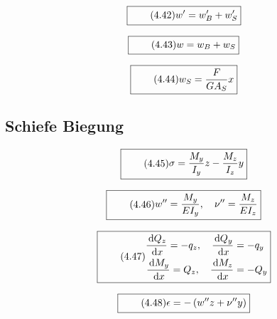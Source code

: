 \documentclass[11pt]{article}
\newcommand{\1}{ {\mathds{1}} }
\newcommand{\td}{\,\text{d}}
\begin{document}
\begin{multicols}{2}
		\begin{equation}
			\boxed{
				\tag{4.42}
				\begin{split}
					w' = w_B' + w_S'
				\end{split}
			}
		\end{equation}

		\begin{equation}
			\boxed{
				\tag{4.43}
				\begin{split}
					w = w_B + w_S
				\end{split}
			}
		\end{equation}
		
		\begin{equation}
			\boxed{
				\tag{4.44}
				\begin{split}
					w_S= \frac{F}{GA_S}x
				\end{split}
			}
		\end{equation}

		\subsection{Schiefe Biegung}

		\begin{equation}
			\boxed{
				\tag{4.45}
				\begin{split}
					\sigma = \frac{M_y}{I_y}z - \frac{M_z}{I_z}y
				\end{split}
			}
		\end{equation}
		
		\begin{equation}
			\boxed{
				\tag{4.46}
				\begin{split}
					w'' = \frac{M_y}{EI_y} , \quad \nu '' = \frac{M_z}{EI_z}
				\end{split}
			}
		\end{equation}

		\begin{equation}
			\boxed{
				\tag{4.47}
				\begin{split}
					\frac{\td Q_z}{\td x} = -q_z, \quad \frac{\td Q_y}{\td x} &= -q_y\\
					\frac{\td M_y}{\td x} = Q_z, \quad \frac{\td M_z}{\td x} &= -Q_y
				\end{split}
			}
		\end{equation}

		\begin{equation}
			\boxed{
				\tag{4.48}
				\begin{split}
					\epsilon = -\left(w'' z + \nu'' y\right)
				\end{split}
			}
		\end{equation}
		

\end{multicols}
\end{document}
